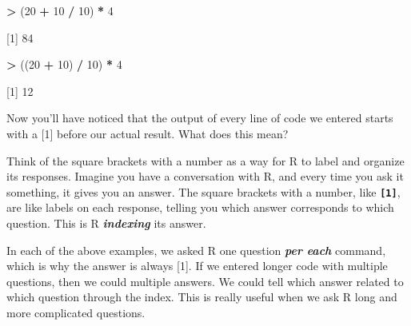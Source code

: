 \documentclass[
]{book}
\newenvironment{Shaded}{\begin{snugshade}}{\end{snugshade}}
\newcommand{\DecValTok}[1]{\textcolor[rgb]{0.00,0.00,0.81}{#1}}
\newcommand{\NormalTok}[1]{#1}
\newcommand{\SpecialCharTok}[1]{\textcolor[rgb]{0.81,0.36,0.00}{\textbf{#1}}}
\begin{document}
\begin{Shaded}
\begin{Highlighting}[]
\SpecialCharTok{\textgreater{}}\NormalTok{ (}\DecValTok{20} \SpecialCharTok{+} \DecValTok{10} \SpecialCharTok{/} \DecValTok{10}\NormalTok{) }\SpecialCharTok{*} \DecValTok{4} 

\NormalTok{[}\DecValTok{1}\NormalTok{] }\DecValTok{84}

\SpecialCharTok{\textgreater{}}\NormalTok{ ((}\DecValTok{20} \SpecialCharTok{+} \DecValTok{10}\NormalTok{) }\SpecialCharTok{/} \DecValTok{10}\NormalTok{) }\SpecialCharTok{*} \DecValTok{4}

\NormalTok{[}\DecValTok{1}\NormalTok{] }\DecValTok{12}
\end{Highlighting}
\end{Shaded}

Now you'll have noticed that the output of every line of code we entered starts with a {[}1{]} before our actual result. What does this mean?

Think of the square brackets with a number as a way for R to label and organize its responses. Imagine you have a conversation with R, and every time you ask it something, it gives you an answer. The square brackets with a number, like \textbf{\texttt{{[}1{]}}}, are like labels on each response, telling you which answer corresponds to which question. This is R \textbf{\emph{indexing}} its answer.

In each of the above examples, we asked R one question \textbf{\emph{per each}} command, which is why the answer is always {[}1{]}. If we entered longer code with multiple questions, then we could multiple answers. We could tell which answer related to which question through the index. This is really useful when we ask R long and more complicated questions.

  
\end{document}
